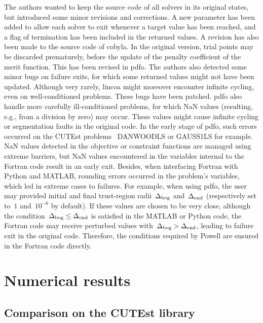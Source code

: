 \documentclass[
    smallextended,  %
    draft,          %
]{svjour3}
\newcommand{\rad}[1][k]{\Delta\ifthenelse{\equal{#1}{}}{}{_{#1}}}
\begin{document}
The authors wanted to keep the source code of all solvers in its original states, but introduced some minor revisions and corrections.
A new parameter has been added to allow each solver to exit whenever a target value has been reached, and a flag of termination has been included in the returned values.
A revision has also been made to the source code of \gls{cobyla}.
In the original version, trial points may be discarded prematurely, before the update of the penalty coefficient of the merit function.
This has been revised in \gls{pdfo}.
The authors also detected some minor bugs on failure exits, for which some returned values might not have been updated.
Although very rarely, \gls{lincoa} might moreover encounter infinite cycling, even on well-conditioned problems.
These bugs have been patched.
\Gls{pdfo} also handle more carefully ill-conditioned problems, for which NaN values (resulting, e.g., from a division by zero) may occur.
These values might cause infinite cycling or segmentation faults in the original code.
In the early stage of \gls{pdfo}, such errors occurred on the CUTEst problems~\cite{Gould_Orban_Toint_2015} DANWOODLS or GAUSS1LS for example.
NaN values detected in the objective or constraint functions are managed using extreme barriers, but NaN values encountered in the variables internal to the Fortran code result in an early exit.
Besides, when interfacing Fortran with Python and MATLAB, rounding errors occurred in the problem's variables, which led in extreme cases to failures.
For example, when using \gls{pdfo}, the user may provided initial and final trust-region radii~$\rad[\text{beg}]$ and~$\rad[\text{end}]$ (respectively set to~$1$ and~$10^{-6}$ by default).
If these values are chosen to be very close, although the condition~$\rad[\text{beg}] \le \rad[\text{end}]$ is satisfied in the MATLAB or Python code, the Fortran code may receive perturbed values with~$\rad[\text{beg}] > \rad[\text{end}]$, leading to failure exit in the original code.
Therefore, the conditions required by Powell are ensured in the Fortran code directly.

\section{Numerical results}
\label{sec:numerical}

\subsection{Comparison on the CUTEst library}
\end{document}

